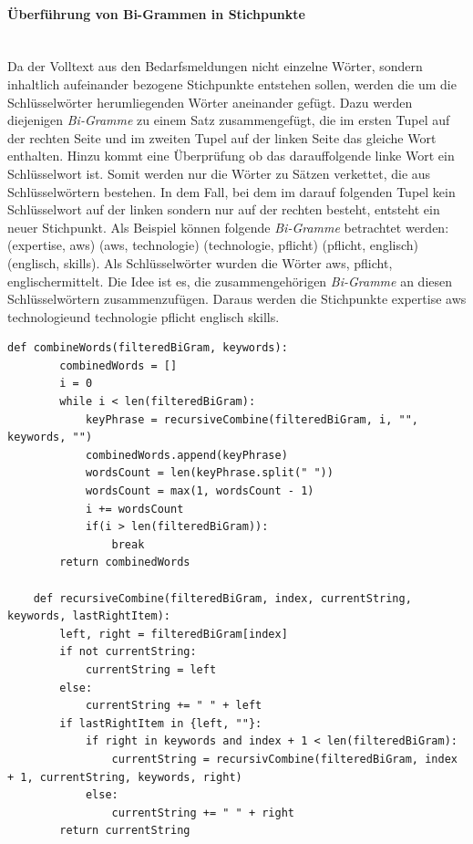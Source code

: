 \paragraph{Überführung von Bi-Grammen in Stichpunkte}\label{par:stichpunkte}\mbox{}\\
Da der Volltext aus den Bedarfsmeldungen nicht einzelne Wörter, sondern inhaltlich aufeinander bezogene Stichpunkte entstehen sollen, werden die um die Schlüsselwörter herumliegenden Wörter aneinander gefügt. Dazu werden diejenigen \emph{Bi-Gramme} zu einem Satz zusammengefügt, die im ersten Tupel auf der rechten Seite und im zweiten Tupel auf der linken Seite das gleiche Wort enthalten. Hinzu kommt eine Überprüfung ob das darauffolgende linke Wort ein Schlüsselwort ist. Somit werden nur die Wörter zu Sätzen verkettet, die aus Schlüsselwörtern bestehen. In dem Fall, bei dem im darauf folgenden Tupel kein Schlüsselwort auf der linken sondern nur auf der rechten besteht, entsteht ein neuer Stichpunkt. Als Beispiel können folgende \emph{Bi-Gramme} betrachtet werden: (\grqq expertise\grqq, \grqq aws\grqq) (\grqq aws\grqq, \grqq technologie\grqq) (\grqq technologie\grqq, \grqq pflicht\grqq) (\grqq pflicht\grqq, \grqq englisch\grqq) (\grqq englisch\grqq, \grqq skills\grqq). Als Schlüsselwörter wurden die Wörter \grqq aws\grqq, \grqq pflicht\grqq, \grqq englisch\grqq ermittelt. Die Idee ist es, die zusammengehörigen \emph{Bi-Gramme} an diesen Schlüsselwörtern zusammenzufügen. Daraus werden die Stichpunkte \grqq expertise aws technologie\grqq und \grqq technologie pflicht englisch skills\grqq.
\begin{lstlisting}[caption={Umformung der Bi-Gramm Liste in Stichpunkte}, label=lst:stichpunkte]
	def combineWords(filteredBiGram, keywords):
		combinedWords = []
		i = 0
		while i < len(filteredBiGram):
			keyPhrase = recursiveCombine(filteredBiGram, i, "", keywords, "")
			combinedWords.append(keyPhrase)
			wordsCount = len(keyPhrase.split(" "))
			wordsCount = max(1, wordsCount - 1)
			i += wordsCount
			if(i > len(filteredBiGram)):
				break
		return combinedWords
	
	def recursiveCombine(filteredBiGram, index, currentString, keywords, lastRightItem):
		left, right = filteredBiGram[index]
		if not currentString:
			currentString = left
		else:
			currentString += " " + left
		if lastRightItem in {left, ""}:
			if right in keywords and index + 1 < len(filteredBiGram):
				currentString = recursivCombine(filteredBiGram, index + 1, currentString, keywords, right)
			else:
				currentString += " " + right
		return currentString
\end{lstlisting}
